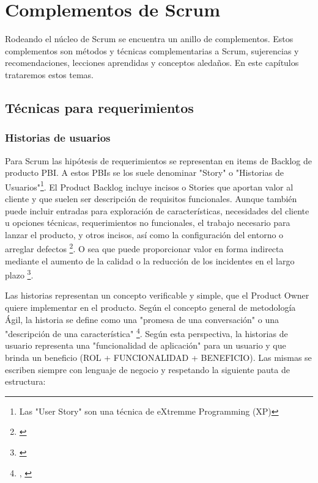 \chapter{Complementos de Scrum}

Rodeando el núcleo de Scrum se encuentra un anillo de complementos. Estos complementos son métodos y técnicas complementarias a Scrum, sujerencias y recomendaciones, lecciones aprendidas y conceptos aledaños. En este capítulos trataremos estos temas.



\newpage
\section{Técnicas para requerimientos}

\subsection{Historias de usuarios}

Para Scrum las hipótesis de requerimientos se representan en items de Backlog de producto PBI. A estos PBIs se los suele denominar "Story" o "Historias de Usuarios"\footnote{Las "User Story" son una técnica de eXtremme Programming (XP)}. El Product Backlog incluye incisos o Stories que aportan valor al cliente y que suelen ser descripción de requisitos funcionales. Aunque también puede incluir entradas para exploración de características, necesidades del cliente u opciones técnicas, requerimientos no funcionales, el trabajo necesario para lanzar el producto, y otros incisos, así como la configuración del entorno o arreglar defectos \footnote{\cite{Scrum-Institute-2015}}. O sea que puede proporcionar valor en forma indirecta mediante el aumento de la calidad o la reducción de los incidentes en el largo plazo \footnote{\cite{Scrum-Institute-2015}}.

Las historias representan un concepto verificable y simple, que el Product Owner quiere implementar en el producto. Según el concepto general de metodología Ágil, la historia se define como una "promesa de una conversación" o una "descripción de una característica" \footnote{\cite{UNTREF-2014}, \cite{Dan-North-2015}}. Según esta perspectiva, la historias de usuario representa una "funcionalidad de aplicación" para un usuario y que brinda un beneficio (ROL + FUNCIONALIDAD + BENEFICIO). Las mismas se escriben siempre con lenguaje de negocio y respetando la siguiente pauta de estructura:

